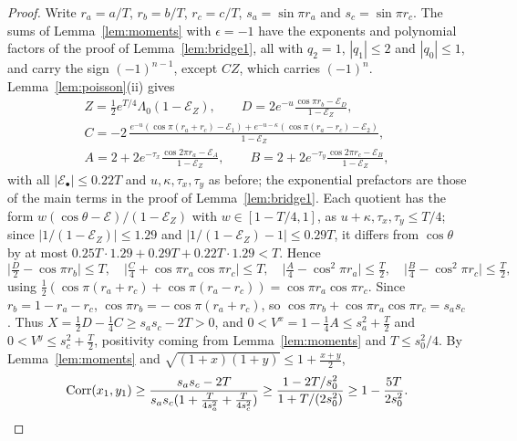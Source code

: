 \begin{proof}
Write $r_a=a/T$, $r_b=b/T$, $r_c=c/T$, $s_a=\sin\pi r_a$ and $s_c=\sin\pi r_c$.
The sums of Lemma~\ref{lem:moments} with $\epsilon=-1$ have the exponents and
polynomial factors of the proof of Lemma~\ref{lem:bridge1}, all with $q_2=1$,
$|q_1|\le2$ and $|q_0|\le1$, and carry the sign $(-1)^{n-1}$, except $CZ$, which
carries $(-1)^n$. Lemma~\ref{lem:poisson}(ii) gives
\begin{gather*}
Z=\tfrac12e^{T/4}\Lambda_0(1-\mathcal E_Z),\qquad D=2e^{-u}\frac{\cos\pi r_b-
\mathcal E_D}{1-\mathcal E_Z},\\
C=-2\,\frac{e^{-u}(\cos\pi(r_a+r_c)-\mathcal E_1)+e^{-u-\kappa}(\cos\pi(r_a-r_c)
-\mathcal E_2)}{1-\mathcal E_Z},\\
A=2+2e^{-\tau_x}\frac{\cos2\pi r_a-\mathcal E_A}{1-\mathcal E_Z},\qquad
B=2+2e^{-\tau_y}\frac{\cos2\pi r_c-\mathcal E_B}{1-\mathcal E_Z},
\end{gather*}
with all $|\mathcal E_\bullet|\le0.22T$ and $u,\kappa,\tau_x,\tau_y$ as before;
the exponential prefactors are those of the main terms in the proof of
Lemma~\ref{lem:bridge1}. Each quotient has the form $w(\cos\theta-\mathcal E)/(1-
\mathcal E_Z)$ with $w\in[1-T/4,1]$, as $u+\kappa,\tau_x,\tau_y\le T/4$; since
$|1/(1-\mathcal E_Z)|\le1.29$ and $|1/(1-\mathcal E_Z)-1|\le0.29T$, it differs
from $\cos\theta$ by at most $0.25T\cdot1.29+0.29T+0.22T\cdot1.29<T$. Hence
\[
\bigl|\tfrac D2-\cos\pi r_b\bigr|\le T,\quad\bigl|\tfrac C4+\cos\pi r_a\cos\pi
r_c\bigr|\le T,\quad\bigl|\tfrac A4-\cos^2\pi r_a\bigr|\le\tfrac T2,\quad\bigl|
\tfrac B4-\cos^2\pi r_c\bigr|\le\tfrac T2,
\]
using $\frac12(\cos\pi(r_a+r_c)+\cos\pi(r_a-r_c))=\cos\pi r_a\cos\pi r_c$. Since
$r_b=1-r_a-r_c$, $\cos\pi r_b=-\cos\pi(r_a+r_c)$, so $\cos\pi r_b+\cos\pi r_a
\cos\pi r_c=s_as_c$. Thus $X=\frac12D-\frac14C\ge s_as_c-2T>0$, and $0<V^x=1-
\frac14A\le s_a^2+\frac T2$ and $0<V^y\le s_c^2+\frac T2$, positivity coming
from Lemma~\ref{lem:moments} and $T\le s_0^2/4$. By Lemma~\ref{lem:moments} and
$\sqrt{(1+x)(1+y)}\le1+\frac{x+y}2$,
\[
\operatorname{Corr}(x_1,y_1)\ge\frac{s_as_c-2T}{s_as_c(1+\frac T{4s_a^2}+\frac T
{4s_c^2})}\ge\frac{1-2T/s_0^2}{1+T/(2s_0^2)}\ge1-\frac{5T}{2s_0^2}.
\qedhere
\]
\end{proof}

